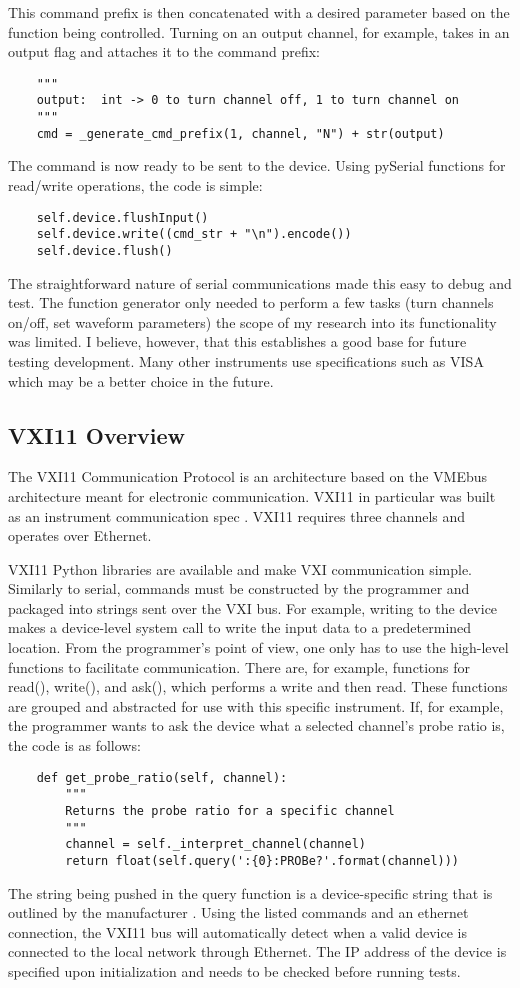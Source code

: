 This command prefix is then concatenated with a desired parameter based on the function being controlled. Turning on an output channel, for example, takes in an output flag and attaches it to the command prefix:
\begin{lstlisting}
	"""
	output:  int -> 0 to turn channel off, 1 to turn channel on
	"""
	cmd = _generate_cmd_prefix(1, channel, "N") + str(output)
\end{lstlisting}
The command is now ready to be sent to the device. Using pySerial functions for read/write operations, the code is simple:
\begin{lstlisting}
	self.device.flushInput()
	self.device.write((cmd_str + "\n").encode())
	self.device.flush()
\end{lstlisting}
The straightforward nature of serial communications made this easy to debug and test. The function generator only needed to perform a few tasks (turn channels on/off, set waveform parameters) the scope of my research into its functionality was limited. I believe, however, that this establishes a good base for future testing development. Many other instruments use specifications such as VISA which may be a better choice in the future.
\FloatBarrier
\subsection{VXI11 Overview}
The VXI11 Communication Protocol is an architecture based on the VMEbus architecture meant for electronic communication. VXI11 in particular was built as an instrument communication spec \cite{vxi}. VXI11 requires three channels and operates over Ethernet.\par
VXI11 Python libraries are available and make VXI communication simple. Similarly to serial, commands must be constructed by the programmer and packaged into strings sent over the VXI bus. For example, writing to the device makes a device-level system call to write the input data to a predetermined location. From the programmer's point of view, one only has to use the high-level functions to facilitate communication. There are, for example, functions for read(), write(), and ask(), which performs a write and then read. These functions are grouped and abstracted for use with this specific instrument. If, for example, the programmer wants to ask the device what a selected channel's probe ratio is, the code is as follows:
\begin{lstlisting}
	def get_probe_ratio(self, channel):
		"""
		Returns the probe ratio for a specific channel
		"""
		channel = self._interpret_channel(channel)
		return float(self.query(':{0}:PROBe?'.format(channel)))
\end{lstlisting}
The string being pushed in the query function is a device-specific string that is outlined by the manufacturer \cite{rigol}. Using the listed commands and an ethernet connection, the VXI11 bus will automatically detect when a valid device is connected to the local network through Ethernet. The IP address of the device is specified upon initialization and needs to be checked before running tests.

